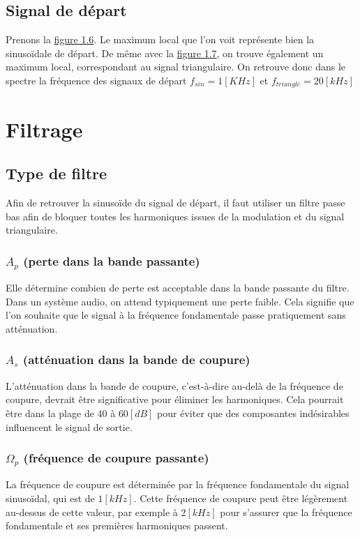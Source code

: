 \documentclass[a4paper,12pt,oneside]{report}	%
\begin{document}
        \subsection{Signal de départ}
            Prenons la \hyperref[fig:fourier_PWM_amp_1kHz]{figure 1.6}. Le maximum local que l'on voit représente bien la sinusoïdale de départ. De même avec la \hyperref[fig:fourier_PWM_amp_20kHz]{figure 1.7}, on trouve également un maximum local, correspondant au signal triangulaire. On retrouve donc dans le spectre la fréquence des signaux de départ $f_{sin} = 1[KHz]$ et $f_{triangle} = 20[kHz]$
    \section{Filtrage}
        \subsection{Type de filtre}
            Afin de retrouver la sinusoïde du signal de départ, il faut utiliser un filtre passe bas afin de bloquer toutes les harmoniques issues de la modulation et du signal triangulaire.\\
            \subsubsection{$A_p$ (perte dans la bande passante)}
            Elle détermine combien de perte est acceptable dans la bande passante du filtre. Dans un système audio, on attend typiquement une perte faible. Cela signifie que l'on souhaite que le signal à la fréquence fondamentale passe pratiquement sans atténuation.\\
            \subsubsection{$A_s$ (atténuation dans la bande de coupure)}
            L'atténuation dans la bande de coupure, c'est-à-dire au-delà de la fréquence de coupure, devrait être significative pour éliminer les harmoniques. Cela pourrait être dans la plage de 40 à $60 [dB]$ pour éviter que des composantes indésirables influencent le signal de sortie.\\
            \subsubsection{$\Omega_p$ (fréquence de coupure passante)}
            La fréquence de coupure est déterminée par la fréquence fondamentale du signal sinusoïdal, qui est de $1 [kHz]$. Cette fréquence de coupure peut être légèrement au-dessus de cette valeur, par exemple à $2 [kHz]$ pour s'assurer que la fréquence fondamentale et ses premières harmoniques passent.\\
\end{document}
